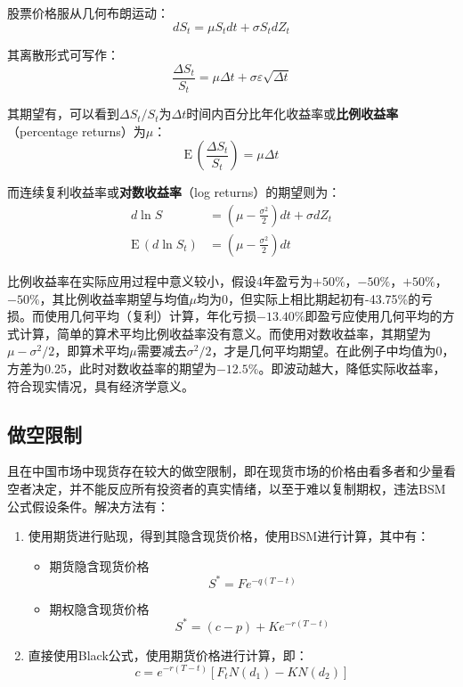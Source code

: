 \documentclass[11pt]{article}
\def\E{{\textrm{E}}\,}
\begin{document}
股票价格服从几何布朗运动：
\begin{equation*}
    dS_t = \mu S_t dt + \sigma S_t dZ_t
\end{equation*}

其离散形式可写作：
\begin{equation*}
    \frac{\Delta S_t}{S_t} = \mu \Delta t + \sigma \varepsilon \sqrt{\Delta t}
\end{equation*}

其期望有，可以看到$\Delta S_t/S_t$为$\Delta t$时间内百分比年化收益率或\textbf{比例收益率}（percentage returns）为$\mu$：
\begin{equation*}
    \E(\frac{\Delta S_t}{S_t}) = \mu \Delta t
\end{equation*}

而连续复利收益率或\textbf{对数收益率}（log returns）的期望则为：
\begin{align*}
    d\ln S       & = (\mu-\frac{\sigma^2}{2})dt+\sigma dZ_t \\
    \E(d\ln S_t) & = (\mu - \frac{\sigma^2}{2})dt
\end{align*}

比例收益率在实际应用过程中意义较小，假设4年盈亏为$+50\%$，$-50\%$，$+50\%$，$-50\%$，其比例收益率期望与均值$\mu$均为0，但实际上相比期起初有-43.75\%的亏损。而使用几何平均（复利）计算，年化亏损$-13.40\%$即盈亏应使用几何平均的方式计算，简单的算术平均比例收益率没有意义。而使用对数收益率，其期望为$\mu-\sigma^2/2$，即算术平均$\mu$需要减去$\sigma^2/2$，才是几何平均期望。在此例子中均值为0，方差为0.25，此时对数收益率的期望为$-12.5\%$。即波动越大，降低实际收益率，符合现实情况，具有经济学意义。

\subsection{做空限制}
且在中国市场中现货存在较大的做空限制，即在现货市场的价格由看多者和少量看空者决定，并不能反应所有投资者的真实情绪，以至于难以复制期权，违法BSM公式假设条件。解决方法有：


\begin{enumerate}
    \item 使用期货进行贴现，得到其隐含现货价格，使用BSM进行计算，其中有：
          \begin{itemize}
              \item 期货隐含现货价格
                    \begin{equation*}
                        S^* = F e^{-q(T-t)}
                    \end{equation*}
              \item 期权隐含现货价格
                    \begin{equation*}
                        S^* = (c-p) + Ke^{-r(T-t)}
                    \end{equation*}
          \end{itemize}
    \item 直接使用Black公式，使用期货价格进行计算，即：
          \begin{equation*}
              c = e^{-r(T-t)} \left[ F_t N(d_1)-K N(d_2) \right]
          \end{equation*}
\end{enumerate}
\end{document}
